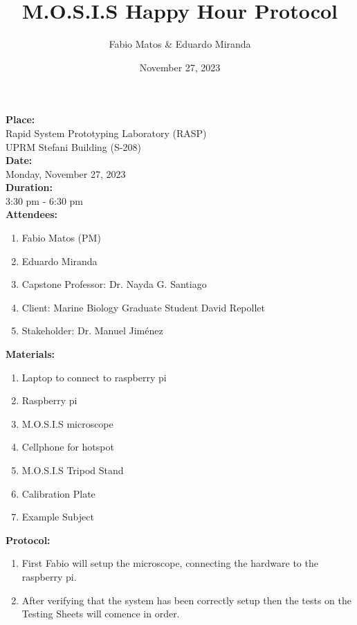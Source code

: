 \documentclass[12pt]{article}
\title{M.O.S.I.S Happy Hour Protocol}
\author{Fabio Matos \& Eduardo Miranda}
\date{November 27, 2023}
\begin{document}
\maketitle
\noindent
\textbf{Place:} \\
Rapid System Prototyping Laboratory (RASP)\\ UPRM Stefani Building (S-208)\\
\textbf{Date:}\\
Monday, November 27, 2023\\
\textbf{Duration:}\\
3:30 pm - 6:30 pm \\
\textbf{Attendees:}
\begin{enumerate}
    \item Fabio Matos (PM)
    \item Eduardo Miranda
    \item Capstone Professor: Dr. Nayda G. Santiago
    \item Client: Marine Biology Graduate Student David Repollet
    \item Stakeholder: Dr. Manuel Jiménez
\end{enumerate}
\textbf{Materials:}
\begin{enumerate}
    \item Laptop to connect to raspberry pi
    \item Raspberry pi
    \item M.O.S.I.S microscope
    \item Cellphone for hotspot
    \item M.O.S.I.S Tripod Stand
    \item Calibration Plate
    \item Example Subject
\end{enumerate}

\textbf{Protocol:}
\begin{enumerate}
    \item First Fabio will setup the microscope, connecting the hardware to the raspberry pi.
    \item After verifying that the system has been correctly setup then the tests on the Testing Sheets will comence in order.
\end{enumerate}
\end{document}
